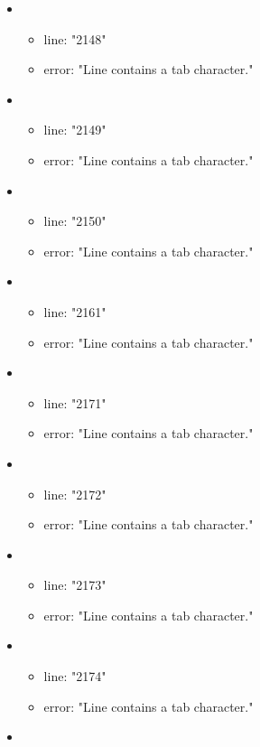 \begin{itemize}
\begin{itemize}
	\end{itemize}
	\item 
	\begin{itemize} 
		\item line: "2148" 
		\item error: "Line contains a tab character." 
	\end{itemize}
	\item 
	\begin{itemize} 
		\item line: "2149" 
		\item error: "Line contains a tab character." 
	\end{itemize}
	\item 
	\begin{itemize} 
		\item line: "2150" 
		\item error: "Line contains a tab character." 
	\end{itemize}
	\item 
	\begin{itemize} 
		\item line: "2161" 
		\item error: "Line contains a tab character." 
	\end{itemize}
	\item 
	\begin{itemize} 
		\item line: "2171" 
		\item error: "Line contains a tab character." 
	\end{itemize}
	\item 
	\begin{itemize} 
		\item line: "2172" 
		\item error: "Line contains a tab character." 
	\end{itemize}
	\item 
	\begin{itemize} 
		\item line: "2173" 
		\item error: "Line contains a tab character." 
	\end{itemize}
	\item 
	\begin{itemize} 
		\item line: "2174" 
		\item error: "Line contains a tab character." 
	\end{itemize}
	\item 
	\begin{itemize} 

\end{itemize}
\end{itemize}
